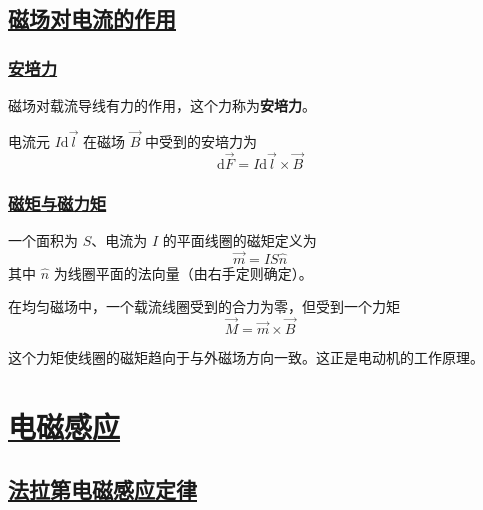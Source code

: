 \subsection{\protect\hyperlink{:}{磁场对电流的作用}}

\subsubsection{\protect\hyperlink{:}{安培力}}

磁场对载流导线有力的作用，这个力称为\textbf{安培力}。

\begin{theorem}[安培力公式]
    电流元 $I\mathrm{d}\vec{l}$ 在磁场 $\vec{B}$ 中受到的安培力为
    \begin{equation}
        \mathrm{d}\vec{F} = I\mathrm{d}\vec{l} \times \vec{B}
    \end{equation}
\end{theorem}

\subsubsection{\protect\hyperlink{:}{磁矩与磁力矩}}

\begin{definition}[磁矩]
    一个面积为 $S$、电流为 $I$ 的平面线圈的磁矩定义为
    \begin{equation}
        \vec{m} = IS\hat{n}
    \end{equation}
    其中 $\hat{n}$ 为线圈平面的法向量（由右手定则确定）。
\end{definition}

在均匀磁场中，一个载流线圈受到的合力为零，但受到一个力矩
\begin{equation}
    \vec{M} = \vec{m} \times \vec{B}
\end{equation}

这个力矩使线圈的磁矩趋向于与外磁场方向一致。这正是电动机的工作原理。


\newpage
\section{\protect\hyperlink{:}{电磁感应}}

\subsection{\protect\hyperlink{:}{法拉第电磁感应定律}}

